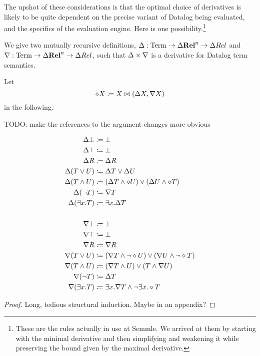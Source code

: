 The upshot of these considerations is that the optimal choice of derivatives is likely
to be quite dependent on the precise variant of Datalog being evaluated, and the
specifics of the evaluation engine. Here is one possibility.\footnote{These are
  the rules actually in use at Semmle. We arrived at them by starting with the
  minimal derivative and then simplifying and weakening it while preserving the
  bound given by the maximal derivative.}

\newcommand{\bothdiff}{\diamond}
\begin{thm}
\label{thm:concreteDatalog}
  We give two mutually recursive definitions,
  $\Delta: \mathrm{Term} \rightarrow \Delta \mathbf{Rel}^n \rightarrow \Delta Rel$ and
  $\nabla: \mathrm{Term} \rightarrow \Delta \mathbf{Rel}^n \rightarrow \Delta Rel$, such
  that $\Delta \times \nabla$ is a derivative for Datalog term semantics.
  
  Let $$\diamond X \coloneqq X \bowtie (\Delta X, \nabla X)$$ in the following.

  TODO: make the references to the argument changes more obvious
  
  \begin{align*}
  \updiff\bot &\defeq \bot\\
  \updiff\top &\defeq \bot\\
  \updiff R &\defeq \updiff R\\
  \updiff(T\vee U) &\defeq \updiff T \vee \updiff U\\
  \updiff(T\wedge U) &\defeq (\updiff T\wedge \bothdiff U) 
                           \vee 
                           (\updiff U \wedge \bothdiff T)\\
  \updiff(\neg T) &\defeq \downdiff T\\
  \updiff(\exists x.T) &\defeq \exists x.\updiff T\\
    \\
  \downdiff\bot &\defeq \bot\\
  \downdiff\top &\defeq \bot\\
  \downdiff R &\defeq \downdiff R\\
  \downdiff(T\vee U) &\defeq (\downdiff T \wedge \neg \bothdiff U) 
                           \vee 
                           (\downdiff U \wedge \neg \bothdiff T)\\
  \downdiff(T\wedge U) &\defeq (\downdiff T\wedge U) \vee (T \wedge \downdiff U)\\
  \downdiff(\neg T) &\defeq \updiff T\\
  \downdiff(\exists x.T) &\defeq \exists x.\downdiff T \wedge \neg \exists x.\bothdiff T
  \end{align*}
\end{thm}
\ifproofs
\begin{proof}
  Long, tedious structural induction. Maybe in an appendix?
\end{proof}
\fi

